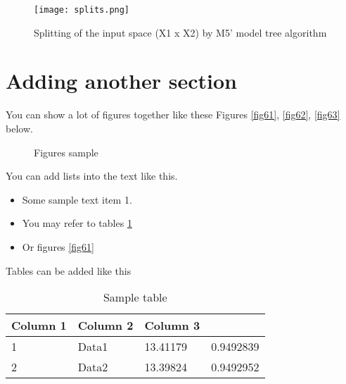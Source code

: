 \begin{figure}[]
\centering
\texttt{[image: splits.png]}
\caption{Splitting of the input space (X1 x X2) by M5' model tree algorithm}
\label{fig5}
\end{figure}

\section{Adding another section}
You can show a lot of figures together like these Figures \ref{fig61}, \ref{fig62}, \ref{fig63} below.
\begin{figure} [!htbp]
\centering    
{}
\caption{Figures sample}
\end{figure}
You can add lists into the text like this. 
\begin{itemize}
\settowidth{\leftmargin}{{\Large$\square$}}\advance\leftmargin{}
\itemsep3pt\relax
\renewcommand\labelitemi{{\lower1pt\hbox{\small$\square$}}}
\item	Some sample text item 1. 
\item You may refer to tables \ref{tab1} 
\item Or figures \ref{fig61}
\end{itemize}

Tables can be added like this
\begin{table}[!htbp]
\centering
\caption{Sample table}
\label{tab1}
\begin{tabular}{llll}

\hline
Column 1 & Column 2 & Column 3       \\\hline
1         & Data1 & 13.41179 & 0.9492839 \\
2            & Data2 & 13.39824 & 0.9492952\\\hline
\end{tabular}
\end{table}


